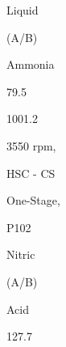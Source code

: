 \documentclass[a4paper,portrait,12pt]{article}
\begin{document}
\begin{flushleft}
Liquid
\end{flushleft}





\begin{flushleft}
(A/B)
\end{flushleft}





\begin{flushleft}
Ammonia
\end{flushleft}





79.5





1001.2





\begin{flushleft}
3550 rpm,
\end{flushleft}


\begin{flushleft}
HSC - CS
\end{flushleft}


\begin{flushleft}
One-Stage,
\end{flushleft}





\begin{flushleft}
P102
\end{flushleft}





\begin{flushleft}
Nitric
\end{flushleft}





\begin{flushleft}
(A/B)
\end{flushleft}





\begin{flushleft}
Acid
\end{flushleft}





127.7
\end{document}
